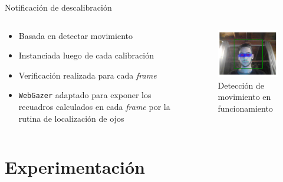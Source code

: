 \documentclass[aspectratio=169]{beamer}
\begin{document}
\begin{frame}{Notificación de descalibración}

  \begin{columns}
    \begin{column}{.5\textwidth}
      \begin{itemize}
        \item Basada en detectar movimiento
        \item Instanciada luego de cada calibración
        \item Verificación realizada para cada \textit{frame}
        \item {} \texttt{WebGazer} adaptado para exponer los
          recuadros calculados en cada \textit{frame} por la rutina de
          localización de ojos
      \end{itemize}
    \end{column}

    \begin{column}{.5\textwidth}
      \begin{figure}
        \centering
        \includegraphics[width=\textwidth]{img/eyetracker-playground-screenshot.png}
        \caption{Detección de movimiento en funcionamiento}
      \end{figure}
    \end{column}
  \end{columns}

\end{frame}

\section{Experimentación}
\end{document}
